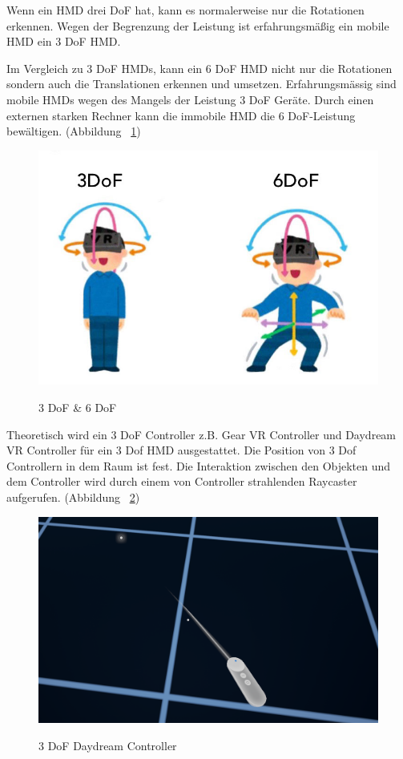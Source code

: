   Wenn ein HMD drei DoF hat, kann es normalerweise nur die Rotationen erkennen. Wegen der Begrenzung der Leistung ist erfahrungsmäßig ein mobile HMD ein 3 DoF HMD.
  
  Im Vergleich zu 3 DoF HMDs, kann ein 6 DoF HMD nicht nur die Rotationen sondern auch die Translationen erkennen und umsetzen. Erfahrungsmässig sind mobile HMDs wegen des Mangels der Leistung 3 DoF Geräte. Durch einen externen starken Rechner kann die immobile HMD die 6 DoF-Leistung bewältigen. (Abbildung ~\ref{fig:6DoF-vs-3DoF})
  
\begin{figure}[ht]
\vspace*{1.5em}
\centering
\caption{3 DoF \& 6 DoF}
\includegraphics[width=\textwidth]{images/6DoF-vs-3DoF.jpg}
\label{fig:6DoF-vs-3DoF}
\vspace*{1em}
\end{figure}
  
  Theoretisch wird ein 3 DoF Controller z.B. Gear VR Controller und Daydream VR Controller für ein 3 Dof HMD ausgestattet. Die Position von 3 Dof Controllern in dem Raum ist fest. Die Interaktion zwischen den Objekten und dem Controller wird durch einem von Controller strahlenden Raycaster aufgerufen. (Abbildung ~\ref{fig:3dcontroller})

\begin{figure}[ht]
\vspace*{1em}
\centering
\caption{3 DoF Daydream Controller}
\includegraphics[width=\textwidth]{images/3dControllerDaydream.png}
\label{fig:3dcontroller} 
\end{figure}


